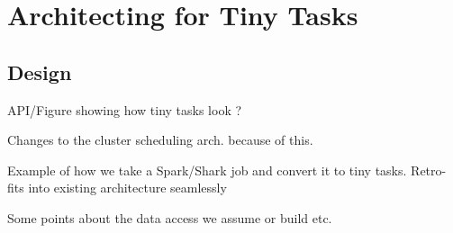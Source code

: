 \section{Architecting for Tiny Tasks}

\subsection{Design}

\begin{myitemize}
  \item API/Figure showing how tiny tasks look ? 
  \item Changes to the cluster scheduling arch. because of this.
  \item Example of how we take a Spark/Shark job and convert it to tiny tasks.
    Retro-fits into existing architecture seamlessly
  \item Some points about the data access we assume or build etc.
\end{myitemize}

